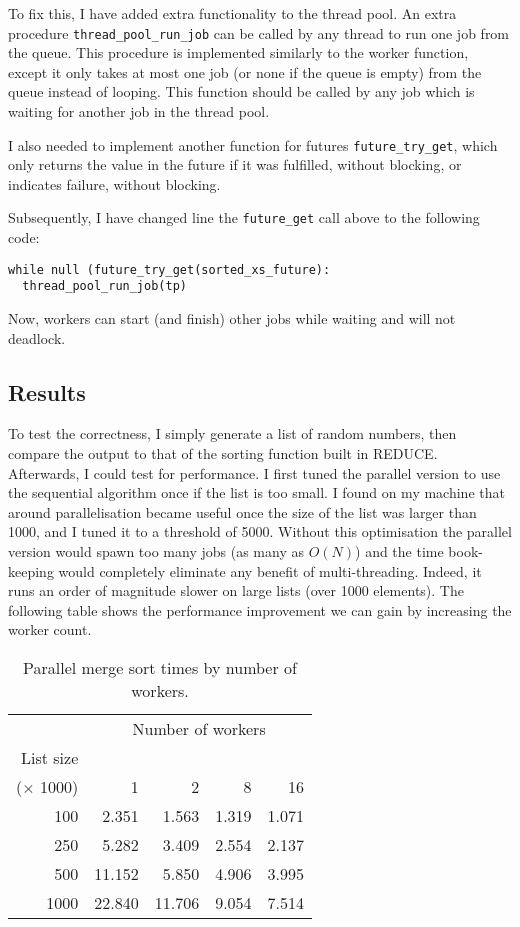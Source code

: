 To fix this, I have added extra functionality to the thread pool. An extra procedure \verb|thread_pool_run_job|
can be called by any thread to run one job from the queue. This procedure is implemented similarly
to the worker function, except it only takes at most one job (or none if the queue is empty) from the
queue instead of looping.
This function should be called by any job which is waiting for another job in the thread pool.

I also needed to implement another function for futures \verb|future_try_get|, which only returns the
value in the future if it was fulfilled, without blocking, or indicates failure, without blocking.

Subsequently, I have changed line the \verb|future_get| call above to the following code:
\begin{verbatim}
while null (future_try_get(sorted_xs_future):
  thread_pool_run_job(tp)
\end{verbatim}
Now, workers can start (and finish) other jobs while waiting and will not deadlock.

\subsection{Results}

To test the correctness, I simply generate a list of random numbers, then compare the output
to that of the sorting function built in REDUCE. Afterwards, I could test for performance.
I first tuned the parallel version to use the sequential algorithm once if the list is too
small. I found on my machine that around parallelisation became useful once the size of
the list was larger than 1000, and I tuned it to a threshold of 5000. Without this optimisation
the parallel version would spawn too many jobs (as many as \(O(N)\)) and the time book-keeping
would completely eliminate any benefit of multi-threading. Indeed, it runs an order of magnitude
slower on large lists (over 1000 elements). The following table shows the performance improvement
we can gain by increasing the worker count.

\begin{table}[H]
\centering
\begin{tabular}{rrrrr}
& \multicolumn{4}{c}{Number of workers} \\
List size & & & \\
($\times$ 1000) & 1 & 2 & 8 & 16\\
\hline
100  & 2.351 & 1.563 & 1.319 & 1.071 \\
250  & 5.282 & 3.409 & 2.554 & 2.137 \\
500  & 11.152 &  5.850 & 4.906 & 3.995 \\
1000 & 22.840 & 11.706 & 9.054 & 7.514 \\
\end{tabular}
\caption{Parallel merge sort times by number of workers.}
\label{table:parmergesort}
\end{table}

